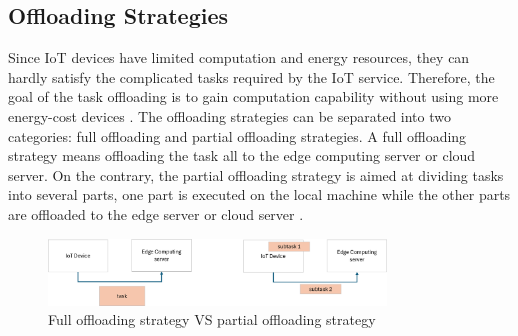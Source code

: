 \documentclass[a4paper,11pt]{article}
\begin{document}
\subsection{Offloading Strategies}
Since IoT devices have limited computation and energy resources, they can hardly satisfy the complicated tasks required by the IoT service. Therefore, the goal of the task offloading is to gain computation capability without using more energy-cost devices \cite{aim_offloading}. The offloading strategies can be separated into two categories: full offloading and partial offloading strategies. A full offloading strategy means offloading the task all to the edge computing server or cloud server. On the contrary, the partial offloading strategy is aimed at dividing tasks into several parts, one part is executed on the local machine while the other parts are offloaded to the edge server or cloud server \cite{full_partial}. 

\begin{figure}[h]
        \centering
        \includegraphics[width=0.8\textwidth]{offloading.png}
        \caption{Full offloading strategy VS partial offloading strategy}
\end{figure}
\end{document}
